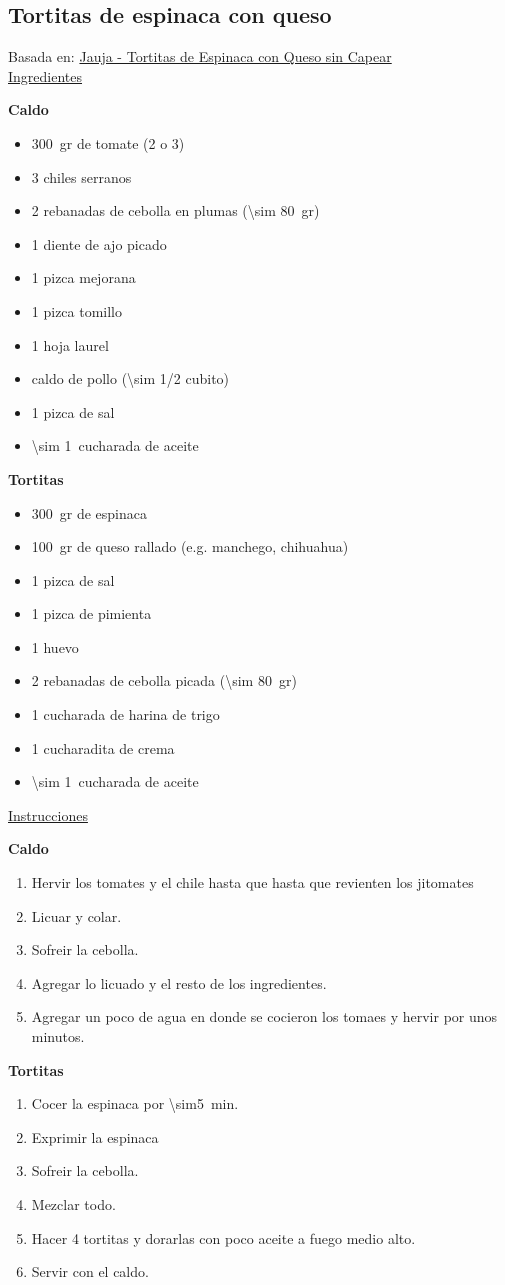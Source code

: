 \subsection{Tortitas de espinaca con queso}

Basada en: \href{https://www.youtube.com/watch?v=r7K9CjKKr6k}{Jauja - Tortitas de Espinaca con Queso sin Capear}\\

\underline{Ingredientes}

\textbf{Caldo}
\begin{itemize}
\item \SI{300}{gr} de tomate (2 o 3)
\item 3 chiles serranos
\item 2 rebanadas de cebolla en plumas (\SI{\sim 80}{gr})
\item 1 diente de ajo picado
\item 1 pizca mejorana
\item 1 pizca tomillo
\item 1 hoja laurel
\item caldo de pollo (\num{\sim 1/2} cubito)
\item 1 pizca de sal
\item \SI{\sim 1}{cucharada} de aceite
\end{itemize}

\textbf{Tortitas}
\begin{itemize}
\item \SI{300}{gr} de espinaca
\item \SI{100}{gr} de queso rallado (e.g. manchego, chihuahua)
\item 1 pizca de sal
\item 1 pizca de pimienta
\item 1 huevo
\item 2 rebanadas de cebolla picada (\SI{\sim 80}{gr})
\item 1 cucharada de harina de trigo
\item 1 cucharadita de crema
\item \SI{\sim 1}{cucharada} de aceite
\end{itemize}

\underline{Instrucciones}

\textbf{Caldo}
\begin{enumerate}
\item Hervir los tomates y el chile hasta que hasta que revienten los jitomates
\item Licuar y colar.
\item Sofreir la cebolla.
\item Agregar lo licuado y el resto de los ingredientes.
\item Agregar un poco de agua en donde se cocieron los tomaes y hervir por unos minutos.
\end{enumerate}

\textbf{Tortitas}
\begin{enumerate}
\item Cocer la espinaca por \SI{\sim5}{min}.
\item Exprimir la espinaca
\item Sofreir la cebolla.
\item Mezclar todo.
\item Hacer 4 tortitas y dorarlas con poco aceite a fuego medio alto.
\item Servir con el caldo.
\end{enumerate}
